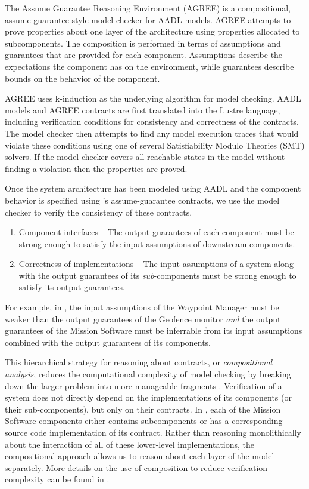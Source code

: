 
The Assume Guarantee Reasoning Environment (AGREE) is a compositional, assume-guarantee-style model
checker for AADL models. AGREE attempts to prove properties about one layer
of the architecture using properties allocated to subcomponents. The composition is performed in
terms of assumptions and guarantees that are provided for each component. Assumptions describe the
expectations the component has on the environment, while guarantees describe bounds on the behavior
of the component. 

AGREE uses k-induction as the underlying algorithm for model checking.  AADL models and AGREE
contracts are first translated into the Lustre language, including verification conditions for consistency
and correctness of the contracts.  The model checker then attempts to find any model execution traces
that would violate these conditions using one of several Satisfiability Modulo Theories (SMT) solvers. 
If the model checker covers all reachable states in the model without finding a violation then the properties are proved. 

Once the system architecture has been modeled using AADL
and the component behavior is specified using \agree's assume-guarantee contracts,
we use the \agree{} model checker to verify the consistency of these contracts.

\begin{enumerate}
\item Component interfaces -- The output guarantees of each component must be strong enough to
satisfy the input assumptions of downstream components. 
\item Correctness of implementations -- The input assumptions of a system along with the 
output guarantees of its \emph{sub}-components must be strong enough to satisfy its output guarantees.
\end{enumerate}

For example, in ,
the input assumptions of the Waypoint Manager must be weaker than
the output guarantees of the Geofence monitor 
\textit{and} the output guarantees of the Mission Software must be inferrable from
its input assumptions combined with the output guarantees of its components.

This hierarchical strategy for reasoning about contracts,
or \emph{compositional analysis},
reduces the computational complexity of model checking
by breaking down the larger problem into more manageable fragments \cite{compositional-analysis-agree}.
Verification of a system does not directly depend on the implementations of its components (or their sub-components),
but only on their contracts.  
In , each of the Mission Software components either contains subcomponents 
or has a corresponding source code implementation of its contract.  
Rather than reasoning monolithically about the interaction of all of these lower-level implementations, 
the compositional approach allows us to reason about each layer of the model separately.  
More details on the use of composition to reduce verification complexity can be found in \cite{case-models-2021}.
